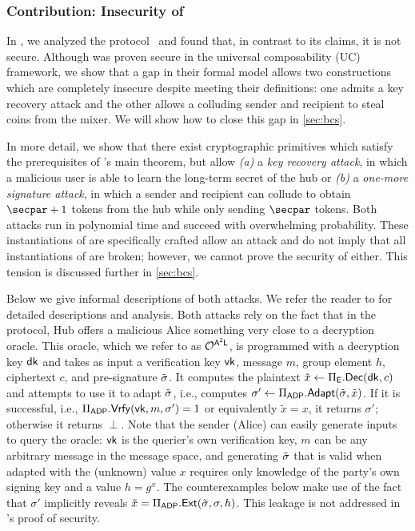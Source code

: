 \subsubsection{Contribution: Insecurity of \texorpdfstring{\AAL}{A2L}}\label{sec:a2l-attacks}

In \cite{CCS:GMMMTT22}, we analyzed the \AAL protocol~\cite{SP:TaiMorMaf21} and found that, in contrast to its claims, it is not secure. Although \AAL was proven secure in the universal composability (UC)~\cite{FOCS:Canetti01} framework, we show that a gap in their formal model allows two constructions which are completely insecure despite meeting their definitions: one admits a key recovery attack and the other allows a colluding sender and recipient to steal coins from the mixer. We will show how to close this gap in \cref{sec:bcs}.

In more detail, we show that there exist cryptographic primitives which satisfy the prerequisites of \AAL's main theorem, but allow \textit{(a)} a \emph{key recovery attack}, in which a malicious user is able to learn the long-term secret of the hub or \textit{(b)} a \emph{one-more signature attack}, in which a sender and recipient can collude to obtain $\secpar+1$ tokens from the hub while only sending $\secpar$ tokens. Both attacks run in polynomial time and succeed with overwhelming probability. These instantiations of \AAL are specifically crafted allow an attack and do not imply that all instantiations of \AAL are broken; however, we cannot prove the security of \AAL either. This tension is discussed further in \cref{sec:bcs}.

Below we give informal descriptions of both attacks. We refer the reader to \cite{CCS:GMMMTT22} for detailed descriptions and analysis. Both attacks rely on the fact that in the \AAL protocol, Hub offers a malicious Alice something very close to a decryption oracle. This oracle, which we refer to as $\mathcal{O}^{\sf A^2L}$, is programmed with a decryption key $\mathsf{dk}$ and takes as input a verification key $\mathsf{vk}$, message $m$, group element $h$, ciphertext $c$, and pre-signature $\tilde{\sigma}$. It computes the plaintext $\tilde{x} \gets \Pi_{\mathsf{E}}.\mathsf{Dec}(\mathsf{dk}, c)$ and attempts to use it to adapt $\tilde{\sigma}$, i.e., computes $\sigma' \gets \Pi_{\mathsf{ADP}}.\mathsf{Adapt}(\tilde{\sigma}, \tilde{x})$. If it is successful, i.e., $\Pi_{\mathsf{ADP}}.\mathsf{Vrfy}(\mathsf{vk}, m, \sigma') = 1$ or equivalently $\tilde{x} = x$, it returns $\sigma'$; otherwise it returns $\perp$. Note that the sender (Alice) can easily generate inputs to query the oracle: $\mathsf{vk}$ is the querier's own verification key, $m$ can be any arbitrary message in the message space, and generating $\tilde{\sigma}$ that is valid when adapted with the (unknown) value $x$ requires only knowledge of the party's own signing key and a value $h = g^x$. The counterexamples below make use of the fact that $\sigma'$ implicitly reveals $\tilde{x} = \Pi_{\mathsf{ADP}}.\mathsf{Ext}(\tilde{\sigma}, \sigma, h)$. This leakage is not addressed in \AAL's proof of security.

